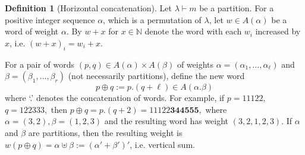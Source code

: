 \documentclass[12pt, reqno]{amsart}
\theoremstyle{definition}
\newtheorem{definition}[theorem]{Definition}
\begin{document}
\begin{definition}[Horizontal concatenation]
    Let $\lambda \vdash m$ be a partition. For a positive integer sequence $\alpha$, which is a permutation of $\lambda$, let $w \in A(\alpha)$ be a word of weight $\alpha$. By $w + x$ for $x\in \mathbb{N}$ denote the word with each $w_i$ increased by $x$, i.e. $(w + x)_i = w_i + x$.

    For a pair of words $(p, q) \in A(\alpha)\times A(\beta)$ of weights $\alpha = (\alpha_1,\ldots,\alpha_{\ell})$ and $\beta = (\beta_1,\ldots,\beta_{r})$ (not necessarily partitions), define the new word 
    $$
        p\oplus q := p.(q + \ell) \in A(\alpha.\beta)
    $$
    where `.' denotes the concatenation of words. %
    For example, if 
    $
        p = 11122,$  
        $q = 122333,$ then 
        $p\oplus q = p.(q+2) = 11122\mathbf{344555},
    $
    where $\alpha = (3,2), \beta = (1,2,3)$ and the resulting word has weight $(3,2,1,2,3)$. If $\alpha$ and $\beta$ are partitions, then the resulting weight is $w(p \oplus q) = \alpha \uplus \beta := (\alpha' + \beta')'$, i.e. vertical sum.


\end{definition}
\end{document}
